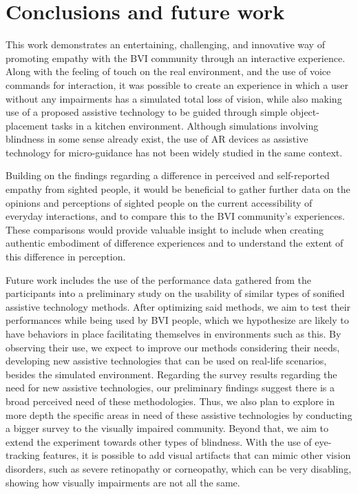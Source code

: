 \documentclass{vgtc}                          %
\begin{document}
\section{Conclusions and future work}
\label{section:conclusion}

This work demonstrates an entertaining, challenging, and innovative way of promoting empathy with the BVI community through an interactive experience. Along with the feeling of touch on the real environment, and the use of voice commands for interaction, it was possible to create an experience in which a user without any impairments has a simulated total loss of vision, while also making use of a proposed assistive technology to be guided through simple object-placement tasks in a kitchen environment. Although simulations involving blindness in some sense already exist, the use of AR devices as assistive technology for micro-guidance has not been widely studied in the same context.

Building on the findings regarding a difference in perceived and self-reported empathy from sighted people, it would be beneficial to gather further data on the opinions and perceptions of sighted people on the current accessibility of everyday interactions, and to compare this to the BVI community's experiences. These comparisons would provide valuable insight to include when creating authentic embodiment of difference experiences and to understand the extent of this difference in perception. 


Future work includes the use of the performance data gathered from the participants into a preliminary study on the usability of similar types of sonified assistive technology methods. After optimizing said methods, we aim to test their performances while being used by BVI people, which we hypothesize are likely to have behaviors in place facilitating themselves in environments such as this. By observing their use, we expect to improve our methods considering their needs, developing new assistive technologies that can be used on real-life scenarios, besides the simulated environment. Regarding the survey results regarding the need for new assistive technologies, our preliminary findings suggest there is a broad perceived need of these methodologies. Thus, we also plan to explore in more depth the specific areas in need of these assistive technologies by conducting a bigger survey to the visually impaired community. Beyond that, we aim to extend the experiment towards other types of blindness. With the use of eye-tracking features, it is possible to add visual artifacts that can mimic other vision disorders, such as severe retinopathy or corneopathy, which can be very disabling, showing how visually impairments are not all the same.
\end{document}
